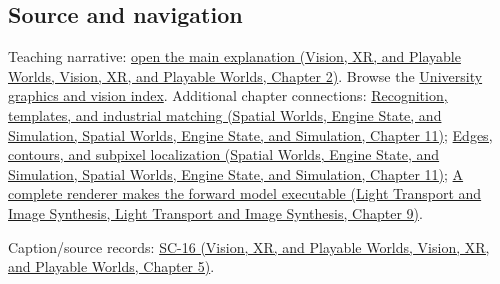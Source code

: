 \subsection{Source and navigation}\label{appendix-772f1fd96148-source-and-navigation}

Teaching narrative: \href{../07-Vision-XR-and-Playable-Worlds/main.pdf\#nameddest=04-visual-computing-ii-ch031-self-supervision-and-evaluation}{open the main explanation (Vision, XR, and Playable Worlds, Vision, XR, and Playable Worlds, Chapter 2)}. Browse the \hyperref[appendix-a6d556a4ef50-university-graphics-vision-and-photography---independent-series]{University graphics and vision index}. Additional chapter connections: \href{../05-Spatial-Worlds-Engine-State-and-Simulation/main.pdf\#nameddest=04-visual-computing-ii-ch030-recognition-templates-and-industrial-matching}{Recognition, templates, and industrial matching (Spatial Worlds, Engine State, and Simulation, Spatial Worlds, Engine State, and Simulation, Chapter 11)}; \href{../05-Spatial-Worlds-Engine-State-and-Simulation/main.pdf\#nameddest=04-visual-computing-ii-ch030-edges-contours-and-subpixel-localization}{Edges, contours, and subpixel localization (Spatial Worlds, Engine State, and Simulation, Spatial Worlds, Engine State, and Simulation, Chapter 11)}; \href{../04-Light-Transport-and-Image-Synthesis/main.pdf\#nameddest=04-visual-computing-ii-ch035-a-complete-renderer-makes-the-forward-model-executable}{A complete renderer makes the forward model executable (Light Transport and Image Synthesis, Light Transport and Image Synthesis, Chapter 9)}.

Caption/source records: \href{../07-Vision-XR-and-Playable-Worlds/main.pdf\#nameddest=04-visual-computing-ii-ch036-sc-16---stanford-cs231n-deep-learning-for-computer-vision-spring-2025-lecture-16-vision-and-language}{SC-16 (Vision, XR, and Playable Worlds, Vision, XR, and Playable Worlds, Chapter 5)}.

